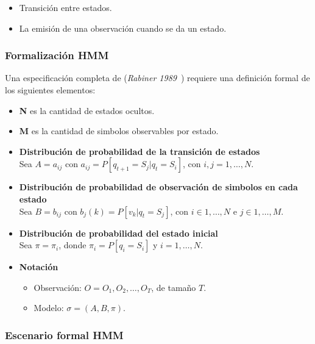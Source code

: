 \begin{itemize}
	\menorEspacioItemize
	\item Transición entre estados.
	\item La emisión de una observación cuando se da un estado.
\end{itemize}



\subsubsection{Formalización HMM}
Una especificación completa de \HMM (\emph{Rabiner 1989}~\cite{Rabiner1990}) requiere una definición formal de los siguientes elementos:


\begin{itemize}
	\menorEspacioItemize
	\item \textbf{N} es la cantidad de estados ocultos.
 	\item \textbf{M} es la cantidad de simbolos observables por estado.
	\item \textbf{ Distribución de probabilidad de la transición de estados}\\
	Sea $A={a_{ij}}$ con $a_{ij} = P[q_{t+1}=S_{j} | q_t = S_i  ]$, con $i,j = 1,\dots,N$.

	\item \textbf{ Distribución de probabilidad de observación de simbolos  en cada estado} \\
	Sea $B={b_{ij}}$ con $b_{j}(k) = P[v_{k}  | q_t = S_j ]$, con $i \in {1,\dots, N}$ e $j \in {1,\dots, M}$.

	\item \textbf{ Distribución de probabilidad del estado inicial}\\
	Sea $\pi = {\pi_{i}}$, donde  $\pi_{i} = P[q_i=S_i] $ y $i=1,\dots,N$.
	\item \textbf{ Notación}
		\begin{itemize}
			\menorEspacioItemize
			\item Observación: $O = O_{1},O_{2},\dots ,O_{T}$, de tamaño $T$.
			\item Modelo: $\sigma = (A,B, \pi)$.
		\end{itemize}


\end{itemize}






\subsubsection{Escenario formal HMM}

